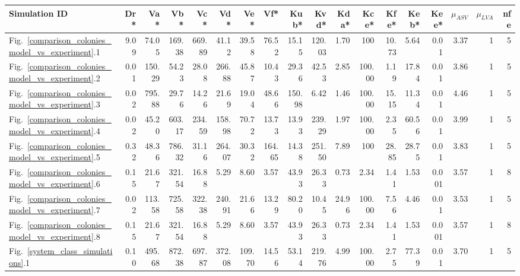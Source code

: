 \begin{table}
    \tiny
    \centering
    \begin{adjustbox}{center}

        \begin{tabular}{lrrrrrrrrrrrrrrrrr}
            \toprule
            \textbf{Simulation ID} & \textbf{Dr*} & \textbf{Va*} & \textbf{Vb*} & \textbf{Vc*} & \textbf{Vd*} & \textbf{Ve*} & \textbf{Vf*} & \textbf{Kub*} & \textbf{Kvd*} & \textbf{Kda*} & \textbf{Kce*} & \textbf{Kfe*} & \textbf{Keb*} & \textbf{Kee*} & \textbf{$\mu_{ASV}$} & \textbf{$\mu_{LVA}$} & \textbf{nfe} \\
            \midrule
            Fig.~\ref{comparison_colonies_model_vs_experiment}.1 & 9.09 & 74.05 & 169.38 & 669.89 & 41.12 & 39.58 & 76.52 & 15.15 & 120.03 & 1.70 & 100 & 10.73 & 5.64 & 0.01 & 3.37 & 1 & 5 \\
             Fig.~\ref{comparison_colonies_model_vs_experiment}.2 & 0.01 & 150.29 & 54.23 & 28.08 & 266.88 & 45.87 & 10.43 & 29.36 & 42.53 & 2.85 & 100.00 & 1.19 & 17.84 & 0.01 & 3.86 & 1 & 5 \\
             Fig.~\ref{comparison_colonies_model_vs_experiment}.3 & 0.02 & 795.88 & 29.76 & 14.26 & 21.69 & 19.04 & 48.66 & 150.98 & 6.42 & 1.46 & 100.00 & 15.15 & 11.34 & 0.01 & 4.46 & 1 & 5 \\
             Fig.~\ref{comparison_colonies_model_vs_experiment}.4 & 0.02 & 45.20 & 603.17 & 234.59 & 158.98 & 70.72 & 13.73 & 13.93 & 239.29 & 1.97 & 100.00 & 2.35 & 60.56 & 0.01 & 3.99 & 1 & 5 \\
             Fig.~\ref{comparison_colonies_model_vs_experiment}.5 & 0.32 & 48.36 & 786.32 & 31.16 & 264.07 & 30.32 & 164.65 & 14.38 & 251.50 & 7.89 & 100 & 28.85 & 28.75 & 0.01 & 3.83 & 1 & 5 \\
             Fig.~\ref{comparison_colonies_model_vs_experiment}.6 & 0.15 & 21.67 & 321.54 & 16.88 & 5.29 & 8.60 & 3.57 & 43.93 & 26.33 & 0.73 & 2.34 & 1.41 & 1.53 & 0.001 & 3.57 & 1 & 8 \\
             Fig.~\ref{comparison_colonies_model_vs_experiment}.7 & 0.02 & 113.58 & 725.58 & 322.38 & 240.91 & 21.66 & 13.29 & 80.20 & 10.45 & 24.96 & 100.00 & 7.56 & 4.46 & 0.01 & 3.53 & 1 & 5 \\
             Fig.~\ref{comparison_colonies_model_vs_experiment}.8 & 0.15 & 21.67 & 321.54 & 16.88 & 5.29 & 8.60 & 3.57 & 43.93 & 26.33 & 0.73 & 2.34 & 1.41 & 1.53 & 0.001 & 3.57 & 1 & 8 \\
             Fig.~\ref{system_class_simulations}.1 & 0.10 & 495.68 & 872.38 & 697.87 & 372.08 & 109.70 & 14.56 & 53.14 & 219.76 & 4.99 & 100.00 & 2.75 & 77.39 & 0.01 & 3.70 & 1 & 5 \\

\end{tabular}
\end{adjustbox}
\end{table}
